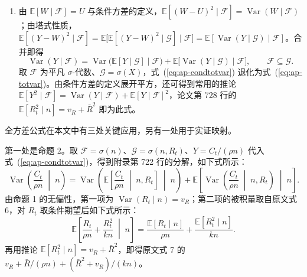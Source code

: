 \begin{enumerate}
\item 由 $\mathbb{E}[W\mid\mathcal F]=U$ 与条件方差的定义，$\mathbb{E}[(W-U)^2\mid\mathcal F]=\operatorname{Var}(W\mid\mathcal F)$；由塔式性质，$\mathbb{E}[(Y-W)^2\mid\mathcal F]=\mathbb{E}\big[\mathbb{E}[(Y-W)^2\mid\mathcal G]\mid\mathcal F\big]=\mathbb{E}[\operatorname{Var}(Y\mid\mathcal G)\mid\mathcal F]$。合并即得
\begin{equation}\label{eq:ap-condtotvar}
\operatorname{Var}(Y\mid\mathcal F)=\operatorname{Var}\big(\mathbb{E}[Y\mid\mathcal G]\mid\mathcal F\big)+\mathbb{E}\big[\operatorname{Var}(Y\mid\mathcal G)\mid\mathcal F\big],\qquad\mathcal F\subseteq\mathcal G .
\end{equation}
取 $\mathcal F$ 为平凡 $\sigma$-代数、$\mathcal G=\sigma(X)$，式~(\ref{eq:ap-condtotvar}) 退化为式~(\ref{eq:ap-totvar})。由条件方差的定义展开平方，还可得到常用的推论 $\mathbb{E}[Y^2\mid\mathcal F]=\operatorname{Var}(Y\mid\mathcal F)+\mathbb{E}[Y\mid\mathcal F]^2$，论文第 728 行的 $\mathbb{E}[R_t^2\mid n]=v_R+\bar R^2$ 即为此式。
\end{enumerate}

全方差公式在本文中有三处关键应用，另有一处用于实证映射。

第一处是命题 2。取 $\mathcal F=\sigma(n)$、$\mathcal G=\sigma(n,R_t)$、$Y=C_t/(\rho n)$ 代入式~(\ref{eq:ap-condtotvar})，得到附录第 722 行的分解，如下式所示：
\begin{equation*}
\operatorname{Var}\!\left(\frac{C_t}{\rho n} \;\middle|\; n\right) = \operatorname{Var}\left(\mathbb{E}\left[\frac{C_t}{\rho n} \;\middle|\; n, R_t\right] \;\middle|\; n\right) + \mathbb{E}\left[\operatorname{Var}\left(\frac{C_t}{\rho n} \;\middle|\; n, R_t\right) \;\middle|\; n\right].
\tag*{原文第 722 行}
\end{equation*}
由命题 1 的无偏性，第一项为 $\operatorname{Var}(R_t\mid n)=v_R$；第二项的被积量取自原文式 6，对 $R_t$ 取条件期望后如下式所示：
\begin{equation*}
\mathbb{E}\left[\frac{R_t}{\rho n} + \frac{R_t^2}{k n} \;\middle|\; n\right] = \frac{\mathbb{E}[R_t \mid n]}{\rho n} + \frac{\mathbb{E}[R_t^2 \mid n]}{k n}.
\tag*{原文第 726 行}
\end{equation*}
再用推论 $\mathbb{E}[R_t^2\mid n]=v_R+\bar R^2$，即得原文式 7 的 $v_R+\bar R/(\rho n)+(\bar R^2+v_R)/(kn)$。

